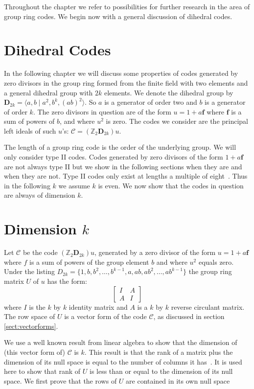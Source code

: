 Throughout the chapter we refer to possibilities for further research in the area of group ring codes.
We begin now with a general discussion of dihedral codes.

\section{Dihedral Codes}
\label{sect:generaldihedralcodes}
In the following chapter we will discuss some properties of codes generated by zero divisors in the group ring formed from the finite field with two elements and a general dihedral group with $2k$ elements.
We denote the dihedral group by $\mathbf{D}_{2k} = \langle a , b \mid a^2 , b^k , (ab)^2 \rangle$.
So $a$ is a generator of order two and $b$ is a generator of order $k$.
The zero divisors in question are of the form $u = 1 + a \mathbf{f}$ where $\mathbf{f}$ is a sum of powers of $b$, and where $u^2$ is zero.
The codes we consider are the principal left ideals of such $u$'s: $\mathcal{C} = (\mathbb{Z}_2 \mathbf{D}_{2k})u$.

The length of a group ring code is the order of the underlying group.
We will only consider type II codes.
Codes generated by zero divisors of the form $1 + a \mathbf{f}$ are not always type II but we show in the following sections when they are and when they are not.
Type II codes only exist at lengths a multiple of eight~\cite{huf05}.
Thus in the following $k$ we assume $k$ is even.
We now show that the codes in question are always of dimension $k$.

\section{Dimension $k$}
\label{sect:gendimension}
Let $\mathcal{C}$ be the code $(\mathbb{Z}_2 \mathbf{D}_{2k})u$, generated by a zero divisor of the form $u = 1 + a \mathbf{f}$ where $f$ is a sum of powers of the group element $b$ and where $u^2$ equals zero.
Under the listing $D_{2k} = \{1,b,b^2,\ldots,b^{k-1},a,ab,ab^2,\ldots,ab^{k-1}\}$ the group ring matrix $U$ of $u$ has the form:
\[\left[ \begin{array}{c|c}
I & A \\
\hline
A & I
\end{array} \right] \]
where $I$ is the $k$ by $k$ identity matrix and $A$ is a $k$ by $k$ reverse circulant matrix.
The row space of $U$ is a vector form of the code $\mathcal{C}$, as discussed in section \ref{sect:vectorforms}.

We use a well known result from linear algebra to show that the dimension of (this vector form of) $\mathcal{C}$ is $k$.
This result is that the rank of a matrix plus the dimension of its null space is equal to the number of columns it has~\cite[p.~245]{mac99}.
It is used here to show that rank of $U$ is less than or equal to the dimension of its null space.
We first prove that the rows of $U$ are contained in its own null space 

